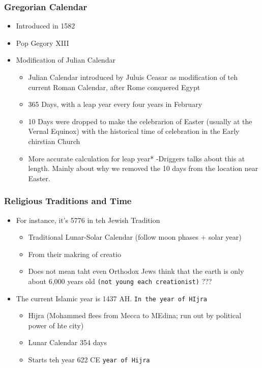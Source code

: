 \documentclass[11pt]{article}
\begin{document}
\subsubsection{Gregorian Calendar}
\label{sec-4-3-1}
\begin{itemize}
\item Introduced in 1582
\item Pop Gegory XIII
\item Modification of Julian Calendar
\begin{itemize}
\item Julian Calendar introduced by Juluis Ceasar as modification of teh current Roman Calendar, after Rome conquered Egypt
\item 365 Days, with a leap year every four years in February
\item 10 Days were dropped to make the celebrarion of Easter (usually at the Vernal Equinox) with the historical time of celebration in the Early chirstian Church
\item More accurate calculation for leap year*
-Driggers talks about this at length. Mainly about why we removed the 10 days from the location near Easter.
\end{itemize}
\end{itemize}
\subsubsection{Religious Traditions and Time}
\label{sec-4-3-2}
\begin{itemize}
\item For instance, it's 5776 in teh Jewish Tradition
\begin{itemize}
\item Traditional Lunar-Solar Calendar (follow moon phases + solar year)
\item From their makring of creatio
\item Does not mean taht even Orthodox Jews think that the earth is only about 6,000 years old \texttt{(not young each creationist)} ???
\end{itemize}
\item The current Islamic year is 1437 AH. \texttt{In the year of HIjra}
\begin{itemize}
\item Hijra (Mohammed flees from Mecca to MEdina; run out by political power of hte city)
\item Lunar Calendar 354 days
\item Starts teh year 622 CE \texttt{year of Hijra}
\end{itemize}
\end{itemize}
\end{document}
